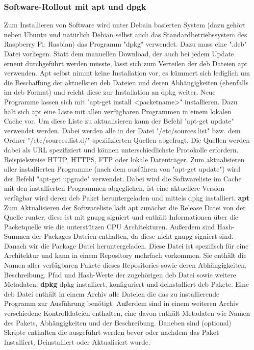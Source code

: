 \subsubsection{Software-Rollout mit apt und dpgk}
Zum Installieren von Software wird unter Debain basierten System (dazu gehört neben Ubuntu und natürlich Debian selbst auch das Standardbetriebssystem des Raspberry Pi: Rasbian) das Programm "dpkg" verwendet.
Dazu muss eine ".deb" Datei vorliegen. Statt dem manuellen Download, der auch bei jedem Update erneut durchgeführt werden müsste, lässt sich zum Verteilen der deb Dateien apt verwenden.
Apt selbst nimmt keine Installation vor, es kümmert sich lediglich um die Beschaffung der aktuellsten deb Dateien und deren Abhängigkeiten (ebenfalls im deb Format) und reicht diese zur Installation an dpkg weiter.
Neue Programme lassen sich mit "apt-get install <packetname>" installieren.
Dazu hält sich apt eine Liste mit allen verfügbaren Programmen in einem lokalen Cache vor. Um diese Liste zu aktualisieren kann der Befehl "apt-get update" verwendet werden.
Dabei werden alle in der Datei "/etc/sources.list" bzw. dem Ordner "/etc/sources.list.d/" spezifizierten Quellen abgefragt.
Die Quellen werden dabei als URL spezifiziert und können unterschiedlichste Protokolle erfordern.
Beispielsweise HTTP, HTTPS, FTP oder lokale Datenträger.
Zum aktualisieren aller installierten Programme (nach dem ausführen von "apt-get update") wird der Befehl "apt-get upgrade" verwendet. Dabei wird die Softwareliste im Cache mit den installierten Programmen abgeglichen, ist eine aktuellere Version verfügbar wird deren deb Paket heruntergeladen und mittels dpkg installiert.
\newline\textbf{apt}\newline
Zum Aktualisieren der Softwareliste lädt apt zunächst die Release Datei von der Quelle runter, diese ist mit gnupg signiert und enthält Informationen über die Packetquelle wie die unterstützen CPU Architekturen.
Außerdem sind Hash-Summen der Packages Dateien enthalten, da diese nicht gnupg signiert sind.
Danach wir die Package Datei heruntergeladen. Diese Datei ist spezifisch für eine Architektur und kann in einem Repository mehrfach vorkommen.
Sie enthält die Namen aller verfügbaren Pakete dieses Repositories sowie deren Abhängigkeiten, Beschreibung, Pfad und Hash-Werte der zugehörigen deb Datei sowie weitere Metadaten.
\newline\textbf{dpkg}\newline
dpkg installiert, konfiguriert und deinstalliert deb Pakete.
Eine deb Datei enthält in einem Archiv alle Dateien die das zu installierende Programm zur Ausführung benötigt.
Außerdem sind in einem weiteren Archiv verschiedene Kontrolldateien enthalten, eine davon enthält Metadaten wie Namen des Pakets, Abhängigkeiten und der Beschreibung.
Daneben sind (optional) Skripte enthalten die ausgeführt werden bevor oder nachdem das Paket Installiert, Deinstalliert oder Aktualisiert wurde. 

